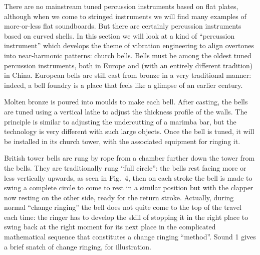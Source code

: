 

  There are no mainstream tuned percussion instruments based on flat plates, 
  although when we come to stringed instruments we will find many examples of 
  more-or-less flat soundboards. But there are certainly percussion instruments 
  based on curved shells. In this section we will look at a kind of 
  ``percussion instrument'' which develops the theme of vibration engineering 
  to align overtones into near-harmonic patterns: church bells. Bells must be 
  among the oldest tuned percussion instruments, both in Europe and (with an 
  entirely different tradition) in China. European bells are still cast from 
  bronze in a very traditional manner: indeed, a bell foundry is a place that 
  feels like a glimpse of an earlier century. 





  Molten bronze is poured into moulds to make each bell. After casting, the 
  bells are tuned using a vertical lathe to adjust the thickness profile of the 
  walls. The principle is similar to adjusting the undercutting of a marimba 
  bar, but the technology is very different with such large objects. Once the 
  bell is tuned, it will be installed in its church tower, with the associated 
  equipment for ringing it. 



  British tower bells are rung by rope from a chamber further down the tower 
  from the bells. They are traditionally rung ``full circle'': the bells rest 
  facing more or less vertically upwards, as seen in Fig.\ 4, then on each 
  stroke the bell is made to swing a complete circle to come to rest in a 
  similar position but with the clapper now resting on the other side, ready 
  for the return stroke. Actually, during normal ``change ringing'' the bell 
  does not quite come to the top of the travel each time: the ringer has to 
  develop the skill of stopping it in the right place to swing back at the 
  right moment for its next place in the complicated mathematical sequence that 
  constitutes a change ringing ``method''. Sound 1 gives a brief snatch of 
  change ringing, for illustration. 


